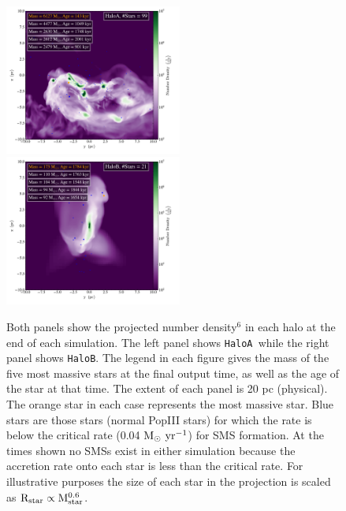 \documentclass[twocolumn,iop,revtex4]{openjournal}
\newcommand{\msolaryrc} {$\rm{M_{\odot}~yr^{-1}}$}
\newcommand{\ha} {\texttt{HaloA~}}
\newcommand{\hbc} {\texttt{HaloB}}
\begin{document}
\begin{figure}
\centering
\begin{minipage}{175mm}      \begin{center} 
\centerline{
\includegraphics[width=0.52\textwidth]{FIGURES/HaloA/Proj_z_number_density_2001.pdf}
\includegraphics[width=0.52\textwidth]{FIGURES/HaloB/Proj_z_number_density_1844.pdf}}
\caption{Both panels show the projected number density$^6$ in each halo at the end of each
  simulation. The left panel shows \ha while the right panel shows \hbc.
  The legend in each figure gives the mass of the five most massive stars at the final output
  time, as well as
  the age of the star at that time. The extent of each panel is 20 pc (physical). The orange
  star in each case represents the most massive star. Blue stars are those stars
  (normal PopIII stars) for which the rate is below the critical rate (0.04 \msolaryrc) for
  SMS formation. At the times shown no
  SMSs exist in either simulation because the accretion rate onto each star is less than the
  critical rate.  For illustrative purposes the size of each star in the
  projection is scaled as $\rm{R_{star}} \propto \rm{M_{star}^{0.6}}$.}  \label{Fig:ProjectionEnd}
\end{center} \end{minipage}

\end{figure}
\end{document}
